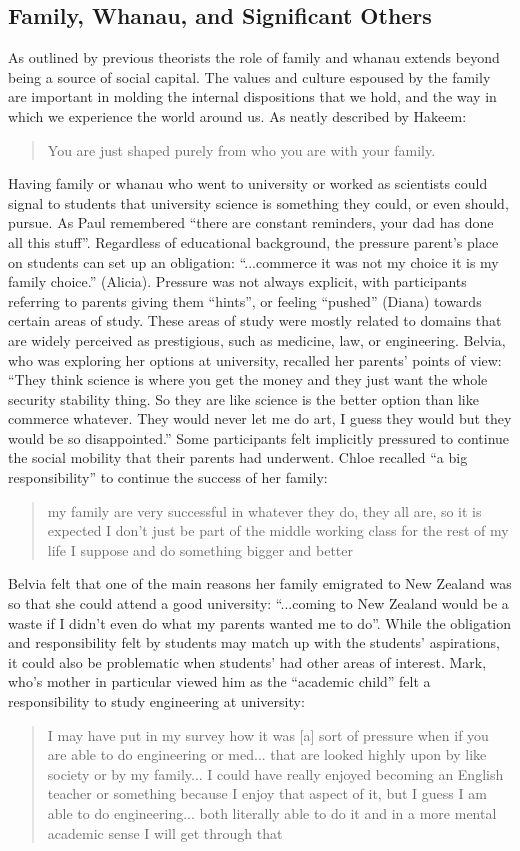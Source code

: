 \subsection{Family, Whanau, and Significant Others}
As outlined by previous theorists \citep{bourdieu1992invitation,Dimaggio1982,Archer_2013,Nash1999} the role of family and whanau extends beyond being a source of social capital. The values and culture espoused by the family are important in molding the internal dispositions that we hold, and the way in which we experience the world around us. As neatly described by Hakeem: \blockquote{You are just shaped purely from who you are with your family.} Having family or whanau who went to university or worked as scientists could signal to students that university science is something they could, or even should, pursue. As Paul remembered ``there are constant reminders, your dad has done all this stuff''. Regardless of educational background, the pressure parent's place on students can set up an obligation: ``...commerce it was not my choice it is my family choice.'' (Alicia). Pressure was not always explicit, with participants referring to parents giving them ``hints'', or feeling ``pushed'' (Diana) towards certain areas of study. These areas of study were mostly related to domains that are widely perceived as prestigious, such as medicine, law, or engineering. Belvia, who was exploring her options at university, recalled her parents' points of view: ``They think science is where you get the money and they just want the whole security stability thing. So they are like science is the better option than like commerce whatever. They would never let me do art, I guess they would but they would be so disappointed.'' Some participants felt implicitly pressured to continue the social mobility that their parents had underwent. Chloe recalled ``a big responsibility'' to continue the success of her family: \blockquote{my family are very successful in whatever they do, they all are, so it is expected I don't just be part of the middle working class for the rest of my life I suppose and do something bigger and better}. Belvia felt that one of the main reasons her family emigrated to New Zealand was so that she could attend a good university: ``...coming to New Zealand would be a waste if I didn't even do what my parents wanted me to do''. While the obligation and responsibility felt by students may match up with the students' aspirations, it could also be problematic when students' had other areas of interest. Mark, who's mother in particular viewed him as the ``academic child'' felt a responsibility to study engineering at university: \blockquote{I may have put in my survey how it was [a] sort of pressure when if you are able to do engineering or med... that are looked highly upon by like society or by my family... I could have really enjoyed becoming an English teacher or something because I enjoy that aspect of it, but I guess I am able to do engineering... both literally able to do it and in a more mental academic sense I will get through that}. 


